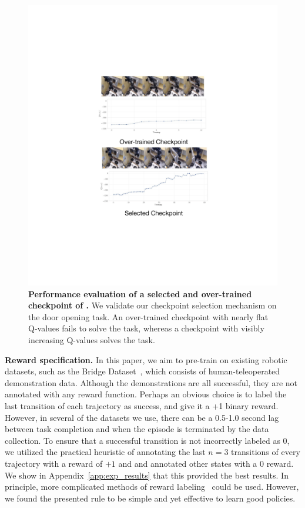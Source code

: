 \begin{figure}[h]
\centering
\vspace{-0.2cm}
  \includegraphics[width=0.65\linewidth]{chapters/ptr/fig_chkpt.pdf}
  \vspace{-0.1cm}
  \caption{\footnotesize \textbf{Performance evaluation of a selected and over-trained checkpoint of \ptrmethodname.} We validate our checkpoint selection mechanism on the door opening task. An over-trained checkpoint with nearly flat Q-values fails to solve the task, whereas a checkpoint with visibly increasing Q-values solves the task.}
  \label{fig:validation_door}
  \vspace{-0.6cm}
\end{figure}

\textbf{Reward specification.} In this paper, we aim to pre-train on existing robotic datasets, such as the Bridge Dataset~\citep{ebert2021bridge}, which consists of human-teleoperated demonstration data. Although the demonstrations are all successful, they are not annotated with any reward function. Perhaps an obvious choice is to label the last transition of each trajectory as success, and give it a +1 binary reward. However, in several of the datasets we use, there can be a 0.5-1.0 second lag between task completion and when the episode is terminated by the data collection. To ensure that a successful transition is not incorrectly labeled as $0$, we utilized the practical heuristic of annotating the last $n=3$ transitions of every trajectory with a reward of $+1$ and and annotated other states with a $0$ reward. We show in Appendix~\ref{app:exp_results} that this provided the best results. 
In principle, more complicated methods of reward labeling~\citep{eysenbach2021replacing} could be used. However, we found the presented rule to be simple and yet effective to learn good policies.

